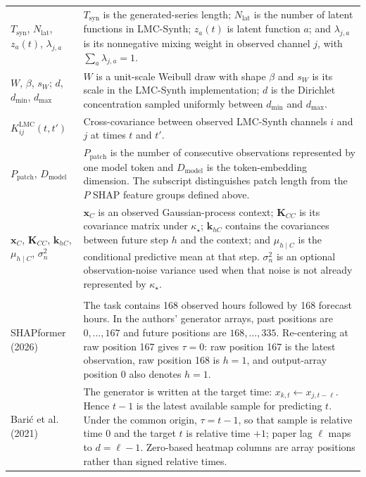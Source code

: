 \begin{longtable}{@{}
>{\raggedright\arraybackslash}p{}
>{\raggedright\arraybackslash}p{}@{}}
$T_{\mathrm{syn}}$, $N_{\mathrm{lat}}$, $z_a(t)$,
$\lambda_{j,a}$ &
$T_{\mathrm{syn}}$ is the generated-series length; $N_{\mathrm{lat}}$ is the
number of latent functions in LMC-Synth; $z_a(t)$ is latent function $a$; and
$\lambda_{j,a}$ is its nonnegative mixing weight in observed channel $j$,
with $\sum_a\lambda_{j,a}=1$. \\

$W$, $\beta$, $s_W$; $d$, $d_{\min}$, $d_{\max}$ &
$W$ is a unit-scale Weibull draw with shape $\beta$ and $s_W$ is its scale in
the LMC-Synth implementation; $d$ is the Dirichlet concentration sampled
uniformly between $d_{\min}$ and $d_{\max}$. \\

$K^{\mathrm{LMC}}_{ij}(t,t')$ &
Cross-covariance between observed LMC-Synth channels $i$ and $j$ at times
$t$ and $t'$. \\

$P_{\mathrm{patch}}$, $D_{\mathrm{model}}$ &
$P_{\mathrm{patch}}$ is the number of consecutive observations represented by
one model token and $D_{\mathrm{model}}$ is the token-embedding dimension.
The subscript distinguishes patch length from the $P$ SHAP feature groups
defined above. \\

$\mathbf x_C$, $\mathbf K_{CC}$, $\mathbf k_{hC}$,
$\mu_{h\mid C}$, $\sigma_n^2$ &
$\mathbf x_C$ is an observed Gaussian-process context; $\mathbf K_{CC}$ is
its covariance matrix under $\kappa_\star$; $\mathbf k_{hC}$ contains the
covariances between future step $h$ and the context; and $\mu_{h\mid C}$ is
the conditional predictive mean at that step. $\sigma_n^2$ is an optional
observation-noise variance used when that noise is not already represented by
$\kappa_\star$. \\

\addlinespace
\multicolumn{2}{@{}l}{\textit{Time-origin convention in each reviewed paper}}\\
\addlinespace

SHAPformer (2026) &
The task contains 168 observed hours followed by 168 forecast hours. In the
authors' generator arrays, past positions are $0,\ldots,167$ and future
positions are $168,\ldots,335$. Re-centering at raw position 167 gives
$\tau=0$: raw position 167 is the latest observation, raw position 168 is
$h=1$, and output-array position 0 also denotes $h=1$. \\

Bari\'c et al. (2021) &
The generator is written at the target time:
$x_{k,t}\leftarrow x_{j,t-\ell}$. Hence $t-1$ is the latest available sample
for predicting $t$. Under the common origin, $\tau=t-1$, so that sample is
relative time 0 and the target $t$ is relative time $+1$; paper lag $\ell$
maps to $d=\ell-1$. Zero-based heatmap columns are array positions rather than
signed relative times. \\


\end{longtable}
